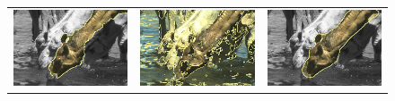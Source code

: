 \documentclass[smallextended]{svjour3}       %
\begin{document}
{{\begin{figure}[hp!]
\begin{tabular}{ccc}
		\includegraphics[scale=0.2]{images/segmentation/bc/camel/gc-seg.png} &
		\includegraphics[scale=0.2]{images/segmentation/schoenemann/camel/camel-seg.png} &
		\includegraphics[scale=0.2]{images/segmentation/bc/camel/corrected-seg.png}\\	

\end{tabular}
\end{figure}}}
\end{document}

